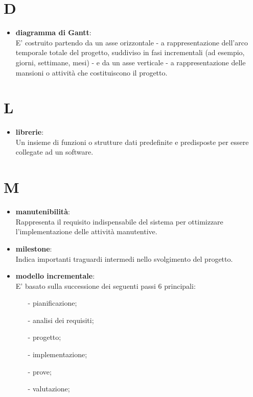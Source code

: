 \documentclass[a4paper, oneside, openany, dvipsnames, table]{article}
\begin{document}
\newpage
\section{D}
\begin{itemize}
\item \textbf{diagramma di Gantt}:\\	E' costruito partendo da un asse orizzontale - a rappresentazione dell'arco temporale totale del progetto, suddiviso in fasi incrementali (ad esempio, giorni, settimane, mesi) - e da un asse verticale - a rappresentazione delle mansioni o attività che costituiscono il progetto.
\end{itemize}


\newpage
\section{L}
\begin{itemize}
\item \textbf{librerie}:\\	Un insieme di funzioni o strutture dati predefinite e predisposte per essere collegate ad un software.
\end{itemize}


\newpage
\section{M}
\begin{itemize}
\item \textbf{manutenibilità}:\\	Rappresenta il requisito indispensabile del sistema per ottimizzare l'implementazione delle attività manutentive.

\end{itemize}

\begin{itemize}
\item \textbf{milestone}:\\		Indica importanti traguardi intermedi nello svolgimento del progetto.
\end{itemize}

\begin{itemize}
\item \textbf{modello incrementale}:\\	E' basato sulla successione dei seguenti passi 6 principali:
\begin{itemize}
\item[-]pianificazione;
\item[-]analisi dei requisiti;
\item[-]progetto;
\item[-]implementazione;
\item[-]prove;
\item[-]valutazione;
\end{itemize}
\end{itemize}
\end{document}
